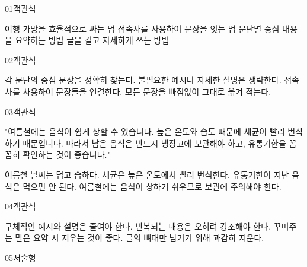 \documentclass[fs11,seriesFre]{korfarm-base}
\begin{document}

\begin{kfQBlock}{01}{객관식}
\begin{kfChoices}
\kfChoice 여행 가방을 효율적으로 싸는 법
\kfChoice 접속사를 사용하여 문장을 잇는 법
\kfChoice 문단별 중심 내용을 요약하는 방법
\kfChoice 글을 길고 자세하게 쓰는 방법
\end{kfChoices}
\end{kfQBlock}
\begin{kfQBlock}{02}{객관식}
\begin{kfChoices}
\kfChoice 각 문단의 중심 문장을 정확히 찾는다.
\kfChoice 불필요한 예시나 자세한 설명은 생략한다.
\kfChoice 접속사를 사용하여 문장들을 연결한다.
\kfChoice 모든 문장을 빠짐없이 그대로 옮겨 적는다.
\end{kfChoices}
\end{kfQBlock}
\begin{kfQBlock}{03}{객관식}
\begin{kfEvidence}"여름철에는 음식이 쉽게 상할 수 있습니다. 높은 온도와 습도 때문에 세균이 빨리 번식하기 때문입니다. 따라서 남은 음식은 반드시 냉장고에 보관해야 하고, 유통기한을 꼼꼼히 확인하는 것이 좋습니다."\end{kfEvidence}
\begin{kfChoices}
\kfChoice 여름철 날씨는 덥고 습하다.
\kfChoice 세균은 높은 온도에서 빨리 번식한다.
\kfChoice 유통기한이 지난 음식은 먹으면 안 된다.
\kfChoice 여름철에는 음식이 상하기 쉬우므로 보관에 주의해야 한다.
\end{kfChoices}
\end{kfQBlock}
\begin{kfQBlock}{04}{객관식}
\begin{kfChoices}
\kfChoice 구체적인 예시와 설명은 줄여야 한다.
\kfChoice 반복되는 내용은 오히려 강조해야 한다.
\kfChoice 꾸며주는 말은 요약 시 지우는 것이 좋다.
\kfChoice 글의 뼈대만 남기기 위해 과감히 지운다.
\end{kfChoices}
\end{kfQBlock}
\begin{kfQBlock}{05}{서술형}
\end{kfQBlock}
\end{document}
